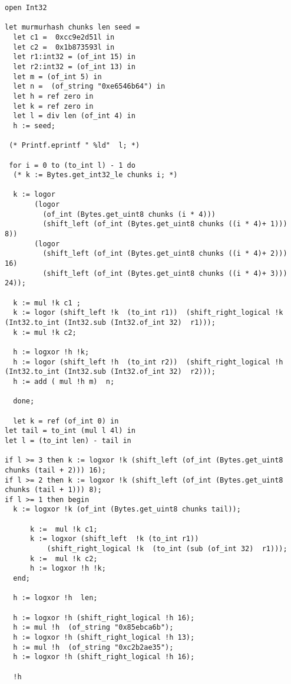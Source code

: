 \documentclass[../../../include/open-logic-chapter]{subfiles}
\begin{document}
			\begin{lstlisting}[style=ocamlstyle,caption={The entire murmurhash function.}]
open Int32

let murmurhash chunks len seed =
  let c1 =  0xcc9e2d51l in
  let c2 =  0x1b873593l in
  let r1:int32 = (of_int 15) in
  let r2:int32 = (of_int 13) in
  let m = (of_int 5) in
  let n =  (of_string "0xe6546b64") in
  let h = ref zero in
  let k = ref zero in
  let l = div len (of_int 4) in
  h := seed;

 (* Printf.eprintf " %ld"  l; *)

 for i = 0 to (to_int l) - 1 do
  (* k := Bytes.get_int32_le chunks i; *)

  k := logor
       (logor
         (of_int (Bytes.get_uint8 chunks (i * 4)))
         (shift_left (of_int (Bytes.get_uint8 chunks ((i * 4)+ 1))) 8))
       (logor
         (shift_left (of_int (Bytes.get_uint8 chunks ((i * 4)+ 2))) 16)
         (shift_left (of_int (Bytes.get_uint8 chunks ((i * 4)+ 3))) 24));

  k := mul !k c1 ;
  k := logor (shift_left !k  (to_int r1))  (shift_right_logical !k  (Int32.to_int (Int32.sub (Int32.of_int 32)  r1)));
  k := mul !k c2;

  h := logxor !h !k;
  h := logor (shift_left !h  (to_int r2))  (shift_right_logical !h  (Int32.to_int (Int32.sub (Int32.of_int 32)  r2)));
  h := add ( mul !h m)  n;

  done;

  let k = ref (of_int 0) in
let tail = to_int (mul l 4l) in
let l = (to_int len) - tail in

if l >= 3 then k := logxor !k (shift_left (of_int (Bytes.get_uint8 chunks (tail + 2))) 16);
if l >= 2 then k := logxor !k (shift_left (of_int (Bytes.get_uint8 chunks (tail + 1))) 8);
if l >= 1 then begin
  k := logxor !k (of_int (Bytes.get_uint8 chunks tail));

      k :=  mul !k c1;
      k := logxor (shift_left  !k (to_int r1))
          (shift_right_logical !k  (to_int (sub (of_int 32)  r1)));
      k :=  mul !k c2;
      h := logxor !h !k;
  end;

  h := logxor !h  len;

  h := logxor !h (shift_right_logical !h 16);
  h := mul !h  (of_string "0x85ebca6b");
  h := logxor !h (shift_right_logical !h 13);
  h := mul !h  (of_string "0xc2b2ae35");
  h := logxor !h (shift_right_logical !h 16);

  !h
	\end{lstlisting}
\end{document}
